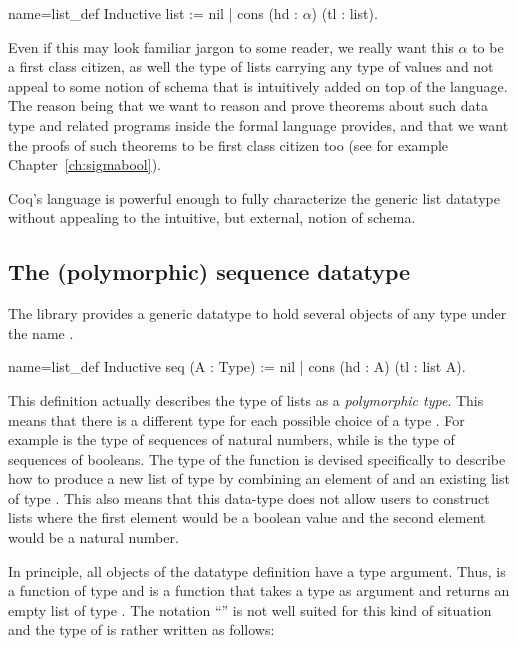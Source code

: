 \begin{coq}{name=list_def}{}
Inductive list := nil | cons (hd : $\alpha$) (tl : list).
\end{coq}

\noindent Even if this may look familiar jargon to some reader, we really want
this $\alpha$ to be a first class citizen, as well the type of lists carrying
any type of values and not appeal to some notion of schema that is intuitively
added on top of the \Coq{} language.  The reason being that we want to reason and
prove theorems about such data type and related programs inside the formal
language \Coq{} provides, and that we want the proofs of such theorems to be first
class citizen too (see for example Chapter~\ref{ch:sigmabool}).

Coq's language is powerful enough to fully characterize the generic 
list datatype without appealing to the intuitive, but external, notion of
schema.

\subsection{The (polymorphic) sequence datatype}

The \mcbMC{} library provides a generic datatype to hold
several objects of any type under the name .

\begin{coq}{name=list_def}{}
Inductive seq (A : Type) := nil | cons (hd : A) (tl : list A).
\end{coq}
This definition actually describes the type of lists as a {\em
  polymorphic type}.  This means that there is a different type
 for each possible choice of a type .  For example
 is the type of sequences of natural numbers, while
 is the type of sequences of booleans.
The type of the
function  is devised specifically to describe how to produce a
new list of type  by combining an element of  and an
existing list of type .  This also means that this data-type
does not allow users to construct lists where the first element would be
a boolean value and the second element would be a natural number.

In principle, all objects of the datatype definition have a type
argument.  Thus,  is a function of type  and
 is a function that takes a type  as argument and returns
an empty list of type .  The notation ``'' is not
well suited for this kind of situation and the type of  is
rather written as follows:

